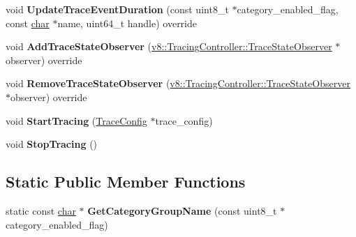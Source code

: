 \begin{DoxyCompactItemize}
\item 
\mbox{\label{classv8_1_1platform_1_1tracing_1_1TracingController_ade75afc5e244dc4c9152c040cffc7930}} 
void {\bfseries Update\+Trace\+Event\+Duration} (const uint8\+\_\+t $\ast$category\+\_\+enabled\+\_\+flag, const \mbox{\hyperlink{classchar}{char}} $\ast$name, uint64\+\_\+t handle) override
\item 
\mbox{\label{classv8_1_1platform_1_1tracing_1_1TracingController_adddb712334bc9fd3e5c18b5f7d5e1c25}} 
void {\bfseries Add\+Trace\+State\+Observer} (\mbox{\hyperlink{classv8_1_1TracingController_1_1TraceStateObserver}{v8\+::\+Tracing\+Controller\+::\+Trace\+State\+Observer}} $\ast$observer) override
\item 
\mbox{\label{classv8_1_1platform_1_1tracing_1_1TracingController_ad268fa7dd8f0182092a48da0cd28d73e}} 
void {\bfseries Remove\+Trace\+State\+Observer} (\mbox{\hyperlink{classv8_1_1TracingController_1_1TraceStateObserver}{v8\+::\+Tracing\+Controller\+::\+Trace\+State\+Observer}} $\ast$observer) override
\item 
\mbox{\label{classv8_1_1platform_1_1tracing_1_1TracingController_a3362b081a3ba0eeff68655402d604e8f}} 
void {\bfseries Start\+Tracing} (\mbox{\hyperlink{classv8_1_1platform_1_1tracing_1_1TraceConfig}{Trace\+Config}} $\ast$trace\+\_\+config)
\item 
\mbox{\label{classv8_1_1platform_1_1tracing_1_1TracingController_a7d617c726ecbd7a80bff714911957168}} 
void {\bfseries Stop\+Tracing} ()
\end{DoxyCompactItemize}
\subsection*{Static Public Member Functions}
\begin{DoxyCompactItemize}
\item 
\mbox{\label{classv8_1_1platform_1_1tracing_1_1TracingController_affc76d3a1a531996d379941681815d5e}} 
static const \mbox{\hyperlink{classchar}{char}} $\ast$ {\bfseries Get\+Category\+Group\+Name} (const uint8\+\_\+t $\ast$category\+\_\+enabled\+\_\+flag)
\end{DoxyCompactItemize}
